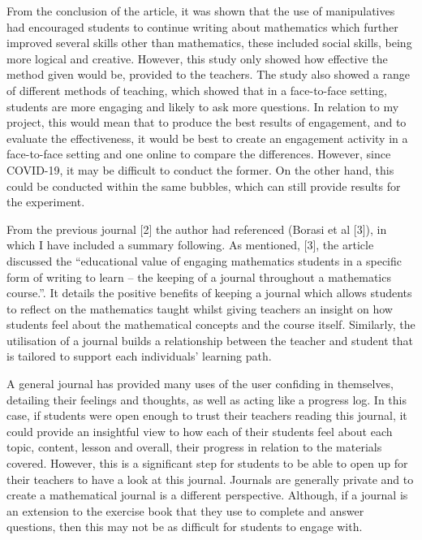 \documentclass[12pt, a4paper,oneside]{book}
\numberwithin{equation}{section}
\begin{document}
From the conclusion of the article, it was shown that the use of manipulatives had encouraged students to continue writing about mathematics which further improved several skills other than mathematics, these included social skills, being more logical and creative. However, this study only showed how effective the method given would be, provided to the teachers. The study also showed a range of different methods of teaching, which showed that in a face-to-face setting, students are more engaging and likely to ask more questions. In relation to my project, this would mean that to produce the best results of engagement, and to evaluate the effectiveness, it would be best to create an engagement activity in a face-to-face setting and one online to compare the differences. However, since COVID-19, it may be difficult to conduct the former. On the other hand, this could be conducted within the same bubbles, which can still provide results for the experiment.


From the previous journal [2] the author had referenced (Borasi et al [3]), in which I have included a summary following. As mentioned, [3], the article discussed the “educational value of engaging mathematics students in a specific form of writing to learn – the keeping of a journal throughout a mathematics course.”. It details the positive benefits of keeping a journal which allows students to reflect on the mathematics taught whilst giving teachers an insight on how students feel about the mathematical concepts and the course itself. Similarly, the utilisation of a journal builds a relationship between the teacher and student that is tailored to support each individuals’ learning path.

A general journal has provided many uses of the user confiding in themselves, detailing their feelings and thoughts, as well as acting like a progress log. In this case, if students were open enough to trust their teachers reading this journal, it could provide an insightful view to how each of their students feel about each topic, content, lesson and overall, their progress in relation to the materials covered. However, this is a significant step for students to be able to open up for their teachers to have a look at this journal. Journals are generally private and to create a mathematical journal is a different perspective. Although, if a journal is an extension to the exercise book that they use to complete and answer questions, then this may not be as difficult for students to engage with.
\end{document}
